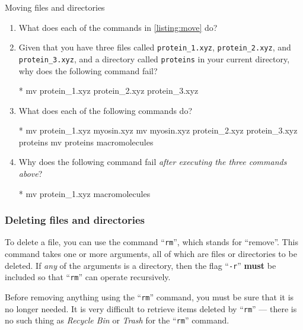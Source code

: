      \begin{task}[label=task:move]{Moving files and directories}
        \begin{enumerate}[label=(\alph*)]
          \item What does each of the commands in \cref{listing:move} do?
          \item Given that you have three files called \texttt{protein\_1.xyz}, \texttt{protein\_2.xyz}, and \texttt{protein\_3.xyz}, and a directory called \texttt{proteins} in your current directory, why does the following command fail?
          \begin{bashcmd}*{}
            mv protein_1.xyz protein_2.xyz protein_3.xyz
          \end{bashcmd}

          \item What does each of the following commands do?
          \begin{bashcmd}*{}
            mv protein_1.xyz myosin.xyz
            mv myosin.xyz protein_2.xyz protein_3.xyz proteins
            mv proteins macromolecules
          \end{bashcmd}

          \item Why does the following command fail \emph{after executing the three commands above}?
          \begin{bashcmd}*{}
            mv protein_1.xyz macromolecules
          \end{bashcmd}
        \end{enumerate}
      \end{task}

    \subsubsection{Deleting files and directories}
      To delete a file, you can use the command \enquote{\texttt{rm}}, which stands for \enquote{remove}.
      This command takes one or more arguments, all of which are files or directories to be deleted.
      If \emph{any} of the arguments is a directory, then the flag \enquote{\texttt{-r}} \textbf{must} be included so that \enquote{\texttt{rm}} can operate recursively.

      Before removing anything using the \enquote{\texttt{rm}} command, you must be sure that it is no longer needed.
      It is very difficult to retrieve items deleted by \enquote{\texttt{rm}} --- there is no such thing as \emph{Recycle Bin} or \emph{Trash} for the \enquote{\texttt{rm}} command.

